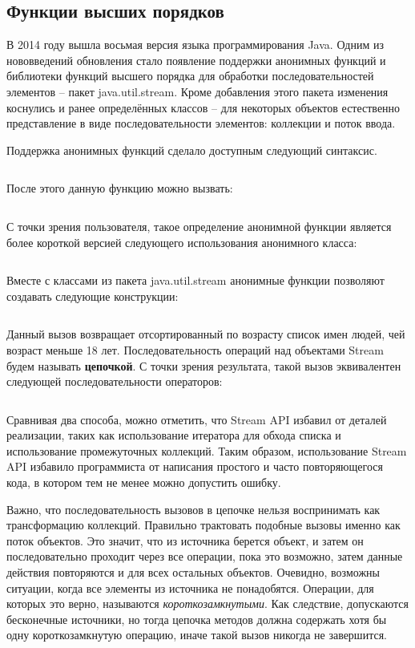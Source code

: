 \subsection{Функции высших порядков} \label{ho-functions}
В 2014 году вышла восьмая версия языка программирования Java. Одним из нововведений обновления 
стало появление поддержки анонимных функций и библиотеки функций высшего порядка для обработки 
последовательностей элементов -- пакет java.util.stream. Кроме добавления этого пакета 
изменения коснулись и ранее определённых классов -- для некоторых объектов естественно 
представление в виде последовательности элементов: коллекции и поток ввода.

Поддержка анонимных функций сделало доступным следующий синтаксис.
\inputminted{java}{chapter1/code/Lambda.java}

После этого данную функцию можно вызвать:
\inputminted{java}{chapter1/code/UseLambda.java}

С точки зрения пользователя, такое определение анонимной функции является более короткой версией следующего использования анонимного класса:

\inputminted{java}{chapter1/code/SameAnonymous.java}

Вместе с классами из пакета java.util.stream анонимные функции позволяют создавать следующие конструкции:

\inputminted{java}{chapter1/code/StreamUsage.java}

Данный вызов возвращает отсортированный по возрасту список имен людей, чей возраст меньше 18 лет.
Последовательность операций над объектами Stream будем называть \textbf{цепочкой}.
С точки зрения результата, такой вызов эквивалентен следующей последовательности операторов: 

\inputminted{java}{chapter1/code/CyclesUsage.java}

Сравнивая два способа, можно отметить, что Stream API избавил от деталей реализации, таких как использование итератора для обхода списка и использование промежуточных коллекций. Таким образом, использование Stream API избавило программиста от написания простого и часто повторяющегося кода, в котором тем не менее можно допустить ошибку.

Важно, что последовательность вызовов в цепочке нельзя воспринимать как трансформацию коллекций. Правильно трактовать подобные вызовы именно как поток объектов. Это значит, что из источника берется объект, и затем он последовательно проходит через все операции, пока это возможно, затем данные действия повторяются и для всех остальных объектов. Очевидно, возможны ситуации, когда все элементы из источника не понадобятся. Операции, для которых это верно, называются \textit{короткозамкнутыми}. Как следствие, допускаются бесконечные источники, но тогда цепочка методов должна содержать хотя бы одну короткозамкнутую операцию, иначе такой вызов никогда не завершится.

